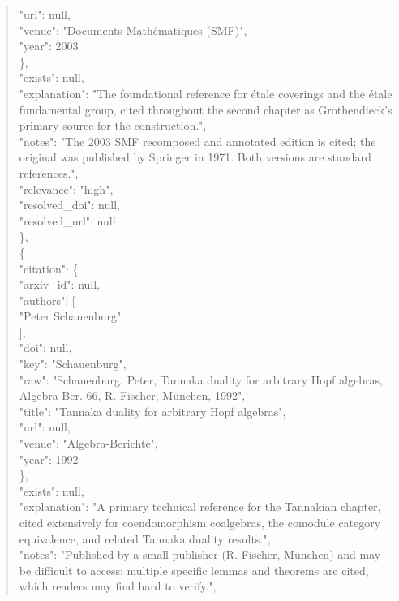 \documentclass[11pt]{article}
\begin{document}
\begin{quote}
        "url": null,\\
        "venue": "Documents Mathématiques (SMF)",\\
        "year": 2003\\
      \},\\
      "exists": null,\\
      "explanation": "The foundational reference for étale coverings and the étale fundamental group, cited throughout the second chapter as Grothendieck's primary source for the construction.",\\
      "notes": "The 2003 SMF recomposed and annotated edition is cited; the original was published by Springer in 1971. Both versions are standard references.",\\
      "relevance": "high",\\
      "resolved\_doi": null,\\
      "resolved\_url": null\\
    \},\\
    \{\\
      "citation": \{\\
        "arxiv\_id": null,\\
        "authors": [\\
          "Peter Schauenburg"\\
        ],\\
        "doi": null,\\
        "key": "Schauenburg",\\
        "raw": "Schauenburg, Peter, Tannaka duality for arbitrary Hopf algebras, Algebra-Ber. 66, R. Fischer, München, 1992",\\
        "title": "Tannaka duality for arbitrary Hopf algebras",\\
        "url": null,\\
        "venue": "Algebra-Berichte",\\
        "year": 1992\\
      \},\\
      "exists": null,\\
      "explanation": "A primary technical reference for the Tannakian chapter, cited extensively for coendomorphism coalgebras, the comodule category equivalence, and related Tannaka duality results.",\\
      "notes": "Published by a small publisher (R. Fischer, München) and may be difficult to access; multiple specific lemmas and theorems are cited, which readers may find hard to verify.",\\

\end{quote}
\end{document}
